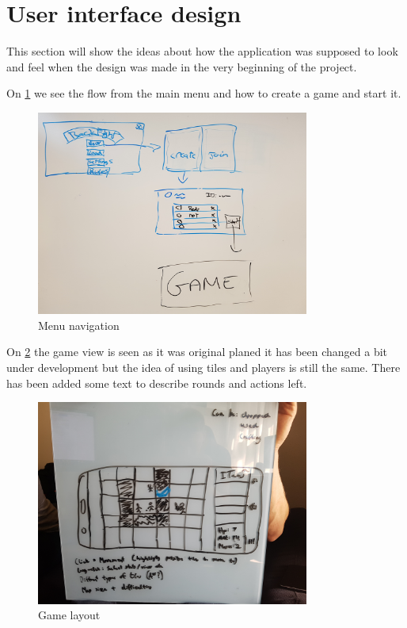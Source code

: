 \section{User interface design}
This section will show the ideas about how the application was supposed to look and feel when the design was made in the very beginning of the project.

On \ref{navigation} we see the flow from the main menu and how to create a game and start it.

\begin{figure}
	\centering
	\includegraphics[width=0.8\textwidth]{images/Gui.png}
	\caption{Menu navigation \label{navigation}}
\end{figure}


On \ref{gameLayout} the game view is seen as it was original planed it has been changed a bit under development but the idea of using tiles and players is still the same. There has been added some text to describe rounds and actions left.

\begin{figure}
	\centering
	\includegraphics[width=0.8\textwidth]{images/GameView.png}
	\caption{Game layout \label{gameLayout}}
\end{figure}
